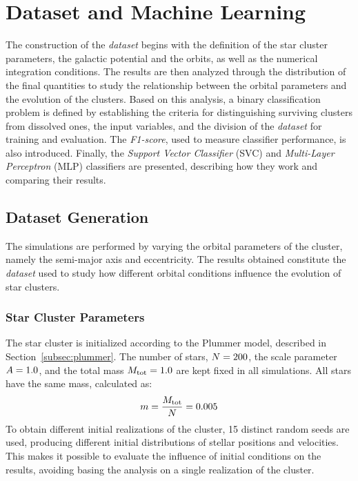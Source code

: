 \chapter{Dataset and Machine Learning}
The construction of the \emph{dataset} begins with the definition of the star cluster parameters, the galactic potential and the orbits, as well as the numerical integration conditions. The results are then analyzed through the distribution of the final quantities to study the relationship between the orbital parameters and the evolution of the clusters.
Based on this analysis, a binary classification problem is defined by establishing the criteria for distinguishing surviving clusters from dissolved ones, the input variables, and the division of the \emph{dataset} for training and evaluation. The \emph{F1-score}, used to measure classifier performance, is also introduced. Finally, the \emph{Support Vector Classifier} (SVC) and \emph{Multi-Layer Perceptron} (MLP) classifiers are presented, describing how they work and comparing their results.
\section{Dataset Generation}
\label{sec:costruzione-dataset}
The simulations are performed by varying the orbital parameters of the cluster, namely the semi-major axis and eccentricity. The results obtained constitute the \emph{dataset} used to study how different orbital conditions influence the evolution of star clusters.
\subsection{Star Cluster Parameters}
\label{subsec:condizioni-iniziali}
The star cluster is initialized according to the Plummer model, described in Section~\ref{subsec:plummer}. The number of stars, $N=200$, the scale parameter $A=1.0$, and the total mass $M_{\mathrm{tot}}=1.0$ are kept fixed in all simulations.
All stars have the same mass, calculated as:
\begin{equation}
	m=\frac{M_{\mathrm{tot}}}{N}=0.005
	\label{eq:massa-singola-stella}
\end{equation}
To obtain different initial realizations of the cluster, 15 distinct random seeds are used, producing different initial distributions of stellar positions and velocities. This makes it possible to evaluate the influence of initial conditions on the results, avoiding basing the analysis on a single realization of the cluster.
